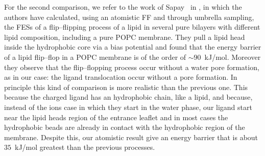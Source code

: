 For the second comparison, we refer to the work of Sapay \etal\, in \cite{Sapay2009}, in which the authors have calculated, using an atomistic \ac{FF} and through umbrella sampling, the \acp{FES} of a flip--flipping process of a lipid in several pure bilayers with different lipid composition, including a pure \ac{POPC} membrane. They pull a lipid head inside the hydrophobic core via a bias potential and found that the energy barrier of a lipid flip--flop in a \ac{POPC} membrane is of the order of $\sim 90$~kJ/mol. Moreover they observe that the flip--flopping process occur without a water pore formation, as in our case: the  ligand translocation occur without a pore formation. In principle this kind of comparison is more realistic than the previous one. This because the charged ligand has an hydrophobic chain, like a lipid, and because, instead of the ions case in which they start in the water phase, our ligand start near the lipid heads region of the entrance leaflet and in most cases the hydrophobic beads are already in contact with the hydrophobic region of the membrane. Despite this, our atomistic result give an energy barrier that is about $35$~kJ/mol greatest than the previous processes.















